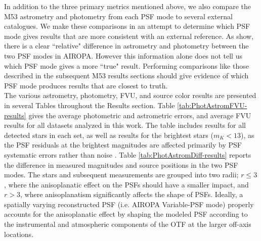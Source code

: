 \documentclass[]{spie}  %
\begin{document}
\indent In addition to the three primary metrics mentioned above, we also compare the M53 astrometry and photometry from each PSF mode to several external catalogues. We make these comparisons in an attempt to determine which PSF mode gives results that are more consistent with an external reference. As \cite{Turri:inprep} show, there is a clear ``relative" difference in astrometry and photometry between the two PSF modes in AIROPA. However this information alone does not tell us which PSF mode gives a more ``true" result. Performing comparisons like those described in the subsequent M53 results sections should give evidence of which PSF mode produces results that are closest to truth.
\\
\indent The various astrometry, photometry, FVU, and source color results are presented in several Tables throughout the Results section. Table \ref{tab:PhotAstromFVU-results} gives the average photometric and astrometric errors, and average FVU results for all datasets analyzed in this work. The table includes results for all detected stars in each set, as well as results for the brightest stars ($m_K < 13$), as the PSF residuals at the brightest magnitudes are affected primarily by PSF systematic errors rather than noise \cite{Turri:inprep}. Table \ref{tab:PhotAstromDiff-results} reports the difference in measured magnitudes and source positions in the two PSF modes. The stars and subsequent measurements are grouped into two radii; $r \leq 3$\textquotesingle\textquotesingle, where the anisoplanatic effect on the PSFs should have a smaller impact, and $r > 3$\textquotesingle\textquotesingle, where anisoplanatism significantly affects the shape of PSFs. Ideally, a spatially varying reconstructed PSF (i.e. AIROPA Variable-PSF mode) properly accounts for the anisoplanatic effect by shaping the modeled PSF according to the instrumental and atmospheric components of the OTF at the larger off-axis locations.
\end{document}
